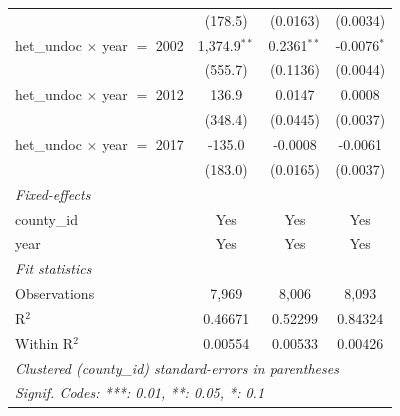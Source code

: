 \begin{tabular}{lccc}
                                                   & (178.5)                          & (0.0163)                     & (0.0034)\\   
   het\_undoc $\times$ year $=$ 2002               & 1,374.9$^{**}$                   & 0.2361$^{**}$                & -0.0076$^{*}$\\   
                                                   & (555.7)                          & (0.1136)                     & (0.0044)\\   
   het\_undoc $\times$ year $=$ 2012               & 136.9                            & 0.0147                       & 0.0008\\   
                                                   & (348.4)                          & (0.0445)                     & (0.0037)\\   
   het\_undoc $\times$ year $=$ 2017               & -135.0                           & -0.0008                      & -0.0061\\   
                                                   & (183.0)                          & (0.0165)                     & (0.0037)\\   
   \midrule
   \emph{Fixed-effects}\\
   county\_id                                      & Yes                              & Yes                          & Yes\\  
   year                                            & Yes                              & Yes                          & Yes\\  
   \midrule
   \emph{Fit statistics}\\
   Observations                                    & 7,969                            & 8,006                        & 8,093\\  
   R$^2$                                           & 0.46671                          & 0.52299                      & 0.84324\\  
   Within R$^2$                                    & 0.00554                          & 0.00533                      & 0.00426\\  
   \midrule \midrule
   \multicolumn{4}{l}{\emph{Clustered (county\_id) standard-errors in parentheses}}\\
   \multicolumn{4}{l}{\emph{Signif. Codes: ***: 0.01, **: 0.05, *: 0.1}}\\
\end{tabular}
\par\endgroup



